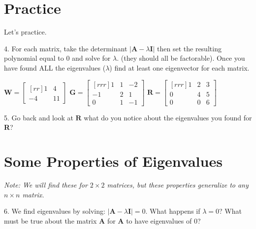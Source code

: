 \documentclass{article}
\begin{document}
\begin{flushleft}
\newpage

\section*{Practice}

Let's practice.

\vspace{0.1in}

4. For each matrix, take the determinant $|\textbf{A}- \lambda \textbf{I}  | $ then set the resulting polynomial equal to 0 and solve for $\lambda$. (they should all be factorable). Once you have found ALL the eigenvalues ($\lambda$) find at least one eigenvector for each matrix.\\

\begin{center}

$\textbf{W}=\begin{bmatrix}[rr] 1 & 4\\-4&11 \end{bmatrix}$
\hspace{0.3in}
$\textbf{G}=\begin{bmatrix}[rrr] 1 & 1 & -2\\ -1 & 2 & 1\\ 0 & 1 & -1 \end{bmatrix}$
\hspace{0.3in}
$\textbf{R}=\begin{bmatrix}[rrr] 1 & 2 & 3 \\ 0 & 4 & 5 \\ 0 & 0 & 6 \end{bmatrix}$

\end{center}

\vspace{6in}

5. Go back and look at $\textbf{R}$ what do you notice about the eigenvalues you found for \textbf{R}?

\newpage

\section*{Some Properties of Eigenvalues}

\textit{ Note: We will find these for $2 \times 2$ matrices, but these properties generalize to any $n \times n$ matrix. }

\vspace{0.3in}

6. We find eigenvalues by solving: $|\textbf{A}- \lambda \textbf{I}  | =0 $. What happens if $\lambda = 0 $? What must be true about the matrix \textbf{A} for \textbf{A} to have eigenvalues of 0?


\end{flushleft}
\end{document}
